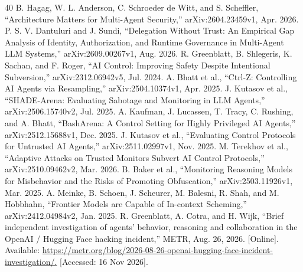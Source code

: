 \begin{thebibliography}{40}
 B. Hagag, W. L. Anderson, C. Schroeder de Witt, and S. Scheffler, “Architecture Matters for Multi-Agent Security,” arXiv:2604.23459v1, Apr. 2026.
 P. S. V. Dantuluri and J. Sundi, “Delegation Without Trust: An Empirical Gap Analysis of Identity, Authorization, and Runtime Governance in Multi-Agent LLM Systems,” arXiv:2609.00267v1, Aug. 2026.
 R. Greenblatt, B. Shlegeris, K. Sachan, and F. Roger, “AI Control: Improving Safety Despite Intentional Subversion,” arXiv:2312.06942v5, Jul. 2024.
 A. Bhatt et al., “Ctrl-Z: Controlling AI Agents via Resampling,” arXiv:2504.10374v1, Apr. 2025.
 J. Kutasov et al., “SHADE-Arena: Evaluating Sabotage and Monitoring in LLM Agents,” arXiv:2506.15740v2, Jul. 2025.
 A. Kaufman, J. Lucassen, T. Tracy, C. Rushing, and A. Bhatt, “BashArena: A Control Setting for Highly Privileged AI Agents,” arXiv:2512.15688v1, Dec. 2025.
 J. Kutasov et al., “Evaluating Control Protocols for Untrusted AI Agents,” arXiv:2511.02997v1, Nov. 2025.
 M. Terekhov et al., “Adaptive Attacks on Trusted Monitors Subvert AI Control Protocols,” arXiv:2510.09462v2, Mar. 2026.
 B. Baker et al., “Monitoring Reasoning Models for Misbehavior and the Risks of Promoting Obfuscation,” arXiv:2503.11926v1, Mar. 2025.
 A. Meinke, B. Schoen, J. Scheurer, M. Balesni, R. Shah, and M. Hobbhahn, “Frontier Models are Capable of In-context Scheming,” arXiv:2412.04984v2, Jan. 2025.
 R. Greenblatt, A. Cotra, and H. Wijk, “Brief independent investigation of agents' behavior, reasoning and collaboration in the OpenAI / Hugging Face hacking incident,” METR, Aug. 26, 2026. [Online]. Available: \url{https://metr.org/blog/2026-08-26-openai-hugging-face-incident-investigation/.} [Accessed: 16 Nov 2026].
\end{thebibliography}
\label{paper:end}
\clearpage